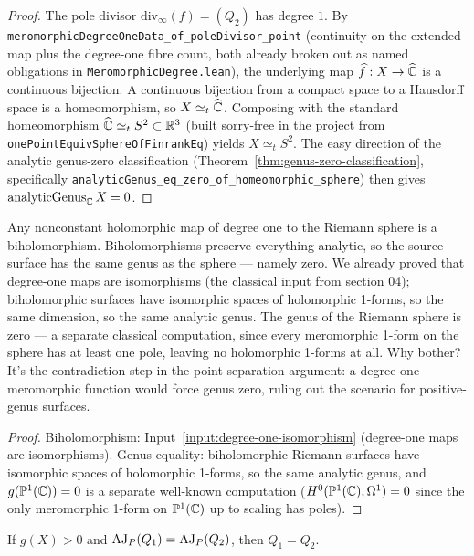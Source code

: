 \begin{proof}\leanok
The pole divisor \(\mathrm{div}_\infty(f) = (Q_2)\) has degree
\(1\). By
\texttt{meromorphicDegreeOneData\_of\_poleDivisor\_point}
(continuity-on-the-extended-map plus the degree-one fibre count, both
already broken out as named obligations in
\texttt{MeromorphicDegree.lean}), the underlying map
\(\widehat f : X \to \widehat{\mathbb{C}}\) is a continuous bijection. A
continuous bijection from a compact space to a Hausdorff space is a
homeomorphism, so \(X \simeq_t \widehat{\mathbb{C}}\). Composing with the
standard homeomorphism
\(\widehat{\mathbb{C}} \simeq_t S^2 \subset \mathbb R^3\) (built sorry-free
in the project from \texttt{onePointEquivSphereOfFinrankEq}) yields
\(X \simeq_t S^2\). The easy direction of the analytic genus-zero
classification (Theorem~\ref{thm:genus-zero-classification},
specifically
\texttt{analyticGenus\_eq\_zero\_of\_homeomorphic\_sphere}) then gives
\(\mathrm{analyticGenus}_{\mathbb{C}}\, X = 0\).
\end{proof}


\begin{layman}
Any nonconstant holomorphic map of degree one to the Riemann sphere is
a biholomorphism. Biholomorphisms preserve everything analytic, so the
source surface has the same genus as the sphere --- namely zero. We
already proved that degree-one maps are isomorphisms (the classical
input from section 04); biholomorphic surfaces have isomorphic spaces
of holomorphic 1-forms, so the same dimension, so the same analytic
genus. The genus of the Riemann sphere is zero --- a separate classical
computation, since every meromorphic 1-form on the sphere has at
least one pole, leaving no holomorphic 1-forms at all. Why
bother? It's the contradiction step in the point-separation argument:
a degree-one meromorphic function would force genus zero, ruling out
the scenario for positive-genus surfaces.
\end{layman}

\begin{proof}\leanok
Biholomorphism: Input~\ref{input:degree-one-isomorphism} (degree-one
maps are isomorphisms). Genus equality: biholomorphic Riemann surfaces
have isomorphic spaces of holomorphic 1-forms, so the same analytic
genus, and \(g(\mathbb{P}^{1}(\mathbb{C}))=0\) is a separate well-known computation
(\(H^{0}(\mathbb{P}^{1}(\mathbb{C}),\Omega^{1})=0\) since the only meromorphic 1-form on
\(\mathbb{P}^{1}(\mathbb{C})\) up to scaling has poles).
\end{proof}

\begin{theorem}
\label{thm:abel-point-separation}
If \(g(X)>0\) and \(\operatorname{AJ}_P(Q_1)=\operatorname{AJ}_P(Q_2)\), then \(Q_1=Q_2\).
\leanok
\end{theorem}

